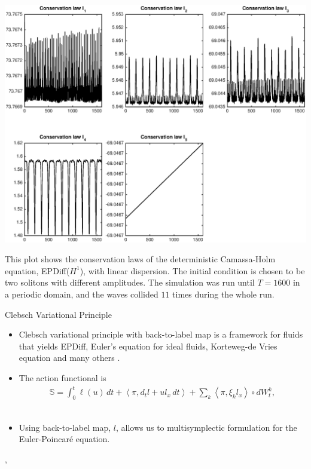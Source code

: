 \documentclass[xcolor={table}]{beamer}
\begin{document}
\begin{frame}[fragile=singleslide,t]
\begin{columns}[onlytextwidth,T]
\begin{column}{.31\textwidth}
\begin{sidefigureh}
\begin{center}
\includegraphics[width=0.9\hsize]{conservation_laws}
\end{center}
\caption{This plot shows the conservation laws of the deterministic Camassa-Holm equation, EPDiff($H^1$), with linear dispersion. The initial condition is chosen to be two solitons with different amplitudes. The simulation was run until $T = 1600$ in a periodic domain, and the waves collided $11$ times during the whole run.}
\end{sidefigureh}


\begin{block}{Clebsch Variational Principle}
\begin{itemize}
\item Clebsch variational principle with back-to-label map is a framework for fluids that yields EPDiff, Euler's equation for ideal fluids, Korteweg-de Vries equation and many others \cite{cotter2007multisymplectic,GHT01}. \\
\item The action functional is
\begin{align*}
\mathbb{S} =\int_0^t \ell(u) \, dt + \left\langle \pi , d_t l +u l_x \, dt \right\rangle + \sum_k \left\langle \pi ,  \xi_k l_x \right\rangle \circ dW_t^k,
\end{align*} \\
\item Using back-to-label map, $l$, allows us to multisymplectic formulation for the
Euler-Poincar\'{e} equation.
\end{itemize}
\end{block}
,



\end{column}
\end{columns}
\end{frame}
\end{document}
